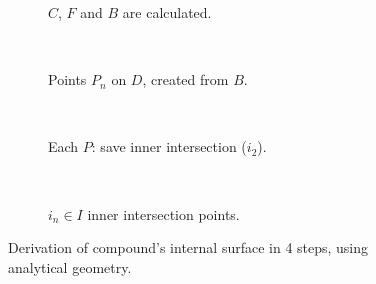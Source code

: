             \begin{figure}
                \centering
                \begin{subfigure}[b]{.5\columnwidth}
                    \centering
                    \begin{tikzpicture}[x=2.5pt,y=2.5pt,scale=0.09
                            ]
                         
                    \end{tikzpicture}
                    \caption{$C$, $F$ and $B$ are calculated.}
                    \label{fig:comp-iter-1}
                \end{subfigure}\\
                \vspace{0.03\textheight}
                \begin{subfigure}[b]{.5\columnwidth}
                    \centering
                    \begin{tikzpicture}[x=2.5pt,y=2.5pt,scale=0.09]
                         
                    \end{tikzpicture}
                    \caption{Points $P_n$ on $D$, created from $B$.}
                    \label{fig:comp-iter-2}
                \end{subfigure}\\
                \vspace{0.03\textheight}
                \begin{subfigure}[b]{.5\columnwidth}
                    \centering
                    \begin{tikzpicture}[x=2.5pt,y=2.5pt,scale=0.09]
                         
                    \end{tikzpicture}
                    \caption{Each $P$: save inner intersection ($i_2$).}
                    \label{fig:comp-iter-3}
                \end{subfigure}\\
                \vspace{0.03\textheight}
                \begin{subfigure}[b]{.5\columnwidth}
                    \centering
                    \begin{tikzpicture}[x=2.5pt,y=2.5pt,scale=0.09
                            ]
                         
                    \end{tikzpicture}
                    \caption{$i_n\in I$ inner intersection points.}
                    \label{fig:comp-iter-4}
                \end{subfigure}

                \caption[Derivation of compound's internal surface using analytical geometry]{Derivation of compound's internal surface in 4 steps, using analytical geometry.}
                \label{fig:comp-iter}
            \end{figure}
            
